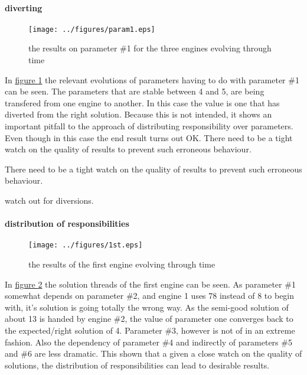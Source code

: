 \documentclass[]{lofar}
\begin{document}
      \paragraph{diverting}

        \begin{figure}
          \texttt{[image: ../figures/param1.eps]}
          \hypertarget{fig:param1}{}
          \caption{the results on parameter \#1 for the three engines evolving through time\label{fig:param1}}
        \end{figure}

        In \hyperlink{fig:param1}{figure \ref{fig:param1}} the
        relevant evolutions of parameters having to do with parameter
        \#1 can be seen. The parameters that are stable between 4 and
        5, are being transfered from one engine to another. In this
        case the value is one that has diverted from the right
        solution. Because this is not intended, it shows an important
        pitfall to the approach of distributing responsibility over
        parameters. Even though in this case the end result turns out
        OK. There need to be a tight watch on the quality of results
        to prevent such erroneous behaviour.

        \begin{lessonlearned}
          There need to be a tight watch on the quality of results to
          prevent such erroneous behaviour.
          \caption{watch out for diversions.\label{les:diversion}}
        \end{lessonlearned}

      \paragraph{distribution of responsibilities}

        \begin{figure}
          \texttt{[image: ../figures/1st.eps]}
          \hypertarget{fig:1st}{}
          \caption{the results of the first engine evolving through time\label{fig:1st}}
        \end{figure}

        In \hyperlink{fig:1st}{figure \ref{fig:1st}} the solution
        threads of the first engine can be seen. As parameter \#1
        somewhat depends on parameter \#2, and engine 1 uses 78
        instead of 8 to begin with, it's solution is going totally the
        wrong way. As the semi-good solution of about 13 is handed by
        engine \#2, the value of parameter one converges back to the
        expected/right solution of 4. Parameter \#3, however is not of
        in an extreme fashion. Also the dependency of parameter \#4
        and indirectly of parameters \#5 and \#6 are less dramatic.
        This shown that a given a close watch on the quality of
        solutions, the distribution of responsibilities can lead to
        desirable results.
\end{document}

